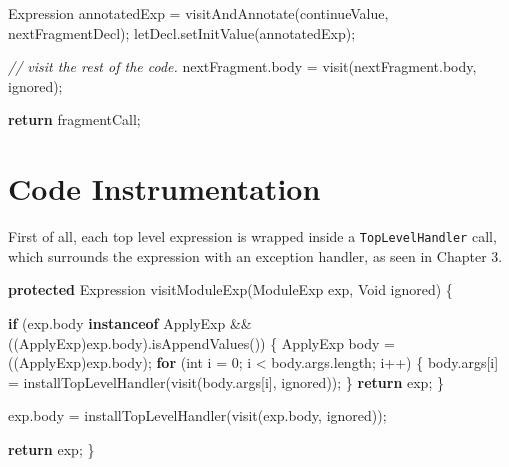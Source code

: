 \documentclass[12pt,a4paper,oneside,openright]{book}
\newenvironment{Shaded}{\begin{snugshade}}{\end{snugshade}}
\newcommand{\KeywordTok}[1]{\textcolor[rgb]{0.13,0.29,0.53}{\textbf{{#1}}}}
\newcommand{\DataTypeTok}[1]{\textcolor[rgb]{0.13,0.29,0.53}{{#1}}}
\newcommand{\DecValTok}[1]{\textcolor[rgb]{0.00,0.00,0.81}{{#1}}}
\newcommand{\CommentTok}[1]{\textcolor[rgb]{0.56,0.35,0.01}{\textit{{#1}}}}
\newcommand{\FunctionTok}[1]{\textcolor[rgb]{0.00,0.00,0.00}{{#1}}}
\newcommand{\NormalTok}[1]{{#1}}
\begin{document}
\begin{Shaded}
\begin{Highlighting}[]
\NormalTok{Expression annotatedExp = }\FunctionTok{visitAndAnnotate}\NormalTok{(continueValue,}
                                           \NormalTok{nextFragmentDecl);}
\NormalTok{letDecl.}\FunctionTok{setInitValue}\NormalTok{(annotatedExp);}

\CommentTok{// visit the rest of the code.}
\NormalTok{nextFragment.}\FunctionTok{body} \NormalTok{= }\FunctionTok{visit}\NormalTok{(nextFragment.}\FunctionTok{body}\NormalTok{, ignored);}

\KeywordTok{return} \NormalTok{fragmentCall;}
\end{Highlighting}
\end{Shaded}

\section{Code Instrumentation}\label{code-instrumentation-1}

First of all, each top level expression is wrapped inside a
\texttt{TopLevelHandler} call, which surrounds the expression with an
exception handler, as seen in Chapter 3.

\begin{Shaded}
\begin{Highlighting}[]
\KeywordTok{protected} \NormalTok{Expression }\FunctionTok{visitModuleExp}\NormalTok{(ModuleExp exp, Void ignored) \{}

    \KeywordTok{if} \NormalTok{(exp.}\FunctionTok{body} \KeywordTok{instanceof} \NormalTok{ApplyExp}
        \NormalTok{&& ((ApplyExp)exp.}\FunctionTok{body}\NormalTok{).}\FunctionTok{isAppendValues}\NormalTok{()) \{}
        \NormalTok{ApplyExp body = ((ApplyExp)exp.}\FunctionTok{body}\NormalTok{);}
        \KeywordTok{for} \NormalTok{(}\DataTypeTok{int} \NormalTok{i = }\DecValTok{0}\NormalTok{; i < body.}\FunctionTok{args}\NormalTok{.}\FunctionTok{length}\NormalTok{; i++) \{}
            \NormalTok{body.}\FunctionTok{args}\NormalTok{[i] = }\FunctionTok{installTopLevelHandler}\NormalTok{(}\FunctionTok{visit}\NormalTok{(body.}\FunctionTok{args}\NormalTok{[i],}
                                                        \NormalTok{ignored));}
        \NormalTok{\}}
        \KeywordTok{return} \NormalTok{exp;}
    \NormalTok{\}}

    \NormalTok{exp.}\FunctionTok{body} \NormalTok{= }\FunctionTok{installTopLevelHandler}\NormalTok{(}\FunctionTok{visit}\NormalTok{(exp.}\FunctionTok{body}\NormalTok{, ignored));}

    \KeywordTok{return} \NormalTok{exp;}
\NormalTok{\}}
\end{Highlighting}
\end{Shaded}
\end{document}
